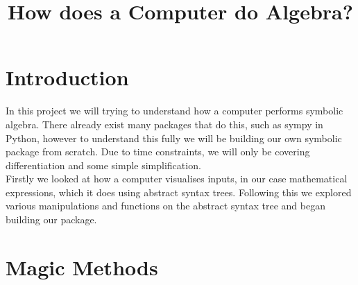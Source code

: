 \documentclass[12pt]{article}
\author{}
\title{\textbf{How does a Computer do Algebra?}}
\date{}
\newcommand\blankpage{
    \null
    \thispagestyle{empty}
    \newpage
    }
\begin{document}
\afterpage{\blankpage}

\maketitle
\newpage

\afterpage{\blankpage}
\tableofcontents



\newpage




\section{Introduction}
In this project we will trying to understand how a computer performs symbolic algebra. There already exist many packages that do this, such as sympy in Python, however to understand this fully we will be building our own symbolic package from scratch. Due to time constraints, we will only be covering differentiation and some simple simplification.\\
Firstly we looked at how a computer visualises inputs, in our case mathematical expressions, which it does using abstract syntax trees. Following this we explored various manipulations and functions on the abstract syntax tree and began building our package.


\section{Magic Methods}
\end{document}
